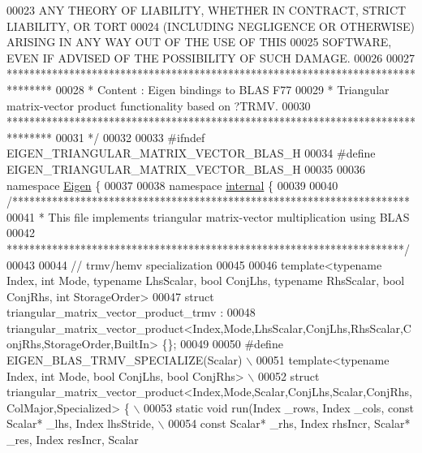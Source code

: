 \begin{DoxyCode}
00023 \textcolor{comment}{ ANY THEORY OF LIABILITY, WHETHER IN CONTRACT, STRICT LIABILITY, OR TORT}
00024 \textcolor{comment}{ (INCLUDING NEGLIGENCE OR OTHERWISE) ARISING IN ANY WAY OUT OF THE USE OF THIS}
00025 \textcolor{comment}{ SOFTWARE, EVEN IF ADVISED OF THE POSSIBILITY OF SUCH DAMAGE.}
00026 \textcolor{comment}{}
00027 \textcolor{comment}{ ********************************************************************************}
00028 \textcolor{comment}{ *   Content : Eigen bindings to BLAS F77}
00029 \textcolor{comment}{ *   Triangular matrix-vector product functionality based on ?TRMV.}
00030 \textcolor{comment}{ ********************************************************************************}
00031 \textcolor{comment}{*/}
00032 
00033 \textcolor{preprocessor}{#ifndef EIGEN\_TRIANGULAR\_MATRIX\_VECTOR\_BLAS\_H}
00034 \textcolor{preprocessor}{#define EIGEN\_TRIANGULAR\_MATRIX\_VECTOR\_BLAS\_H}
00035 
00036 \textcolor{keyword}{namespace }\hyperlink{namespace_eigen}{Eigen} \{ 
00037 
00038 \textcolor{keyword}{namespace }\hyperlink{namespaceinternal}{internal} \{
00039 
00040 \textcolor{comment}{/**********************************************************************}
00041 \textcolor{comment}{* This file implements triangular matrix-vector multiplication using BLAS}
00042 \textcolor{comment}{**********************************************************************/}
00043 
00044 \textcolor{comment}{// trmv/hemv specialization}
00045 
00046 \textcolor{keyword}{template}<\textcolor{keyword}{typename} Index, \textcolor{keywordtype}{int} Mode, \textcolor{keyword}{typename} LhsScalar, \textcolor{keywordtype}{bool} ConjLhs, \textcolor{keyword}{typename} RhsScalar, \textcolor{keywordtype}{bool} ConjRhs, \textcolor{keywordtype}{int} 
      StorageOrder>
00047 \textcolor{keyword}{struct }triangular\_matrix\_vector\_product\_trmv :
00048   triangular\_matrix\_vector\_product<Index,Mode,LhsScalar,ConjLhs,RhsScalar,ConjRhs,StorageOrder,BuiltIn> \{\};
00049 
00050 \textcolor{preprocessor}{#define EIGEN\_BLAS\_TRMV\_SPECIALIZE(Scalar) \(\backslash\)}
00051 \textcolor{preprocessor}{template<typename Index, int Mode, bool ConjLhs, bool ConjRhs> \(\backslash\)}
00052 \textcolor{preprocessor}{struct triangular\_matrix\_vector\_product<Index,Mode,Scalar,ConjLhs,Scalar,ConjRhs,ColMajor,Specialized> \{ \(\backslash\)}
00053 \textcolor{preprocessor}{ static void run(Index \_rows, Index \_cols, const Scalar* \_lhs, Index lhsStride, \(\backslash\)}
00054 \textcolor{preprocessor}{                                     const Scalar* \_rhs, Index rhsIncr, Scalar* \_res, Index resIncr, Scalar
}
\end{DoxyCode}
